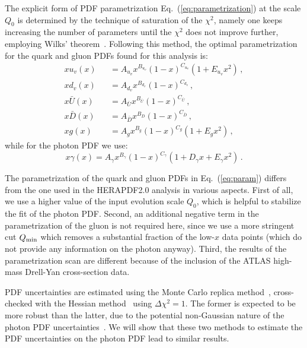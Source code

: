 The explicit form of PDF parametrization Eq.~(\ref{eq:parametrization})
at the scale $Q_0$ is determined by the
technique of saturation of the $\chi^{2}$, namely one keeps increasing
the number of parameters until the $\chi^{2}$ does not improve
further, employing Wilks' theorem~\cite{Wilks:1938dza}.
%
Following this method, the optimal parametrization for the quark and
gluon PDFs found for this analysis is:
\begin{eqnarray}
  \nonumber
  xu_v(x) &&= A_{u_v}x^{B_{u_v}}(1-x)^{C_{u_v}}(1+E_{u_v}x^{2})\, , \\
  \nonumber
xd_v(x) &&= A_{d_v}x^{B_{d_v}}(1-x)^{C_{d_v}}\, , \\
x\bar{U}(x) &&= A_{\bar{U}}x^{B_{\bar{U}}}(1-x)^{C_{\bar{U}}}\, , \\
\nonumber
x\bar{D}(x) &&= A_{\bar{D}}x^{B_{\bar{D}}}(1-x)^{C_{\bar{D}}}\, , \\
\nonumber
\label{eq:param}
xg(x) &&= A_{g}x^{B_{g}}(1-x)^{C_{g}}(1+E_{g}x^{2})\, ,
\end{eqnarray}
while for the photon PDF we use:
\begin{equation}
x\gamma(x) = A_{\gamma}x^{B_{\gamma}}(1-x)^{C_{\gamma}}(1+D_{\gamma}x+E_{\gamma}x^{2}) \, .
\end{equation}


The parametrization of the quark and gluon PDFs in
Eq.~(\ref{eq:param}) differs from the one used in the HERAPDF2.0
analysis in various aspects.
%
First of all, we use a higher value of the input evolution scale
$Q_0$, which is helpful to stabilize the fit of the photon PDF.
%
Second, an additional negative term in the parametrization of the
gluon is not required here, since we use a more stringent cut
$Q_{\rm min}$ which removes a substantial fraction of the low-$x$ data points (which do
not provide any information on the photon anyway).
%
Third, the results of the parametrization scan are different because of the
inclusion of the ATLAS high-mass Drell-Yan cross-section data.

PDF uncertainties are estimated using the Monte Carlo replica
method~\cite{DelDebbio:2004xtd,DelDebbio:2007ee,Ball:2008by},
cross-checked with
the Hessian method~\cite{Pumplin:2001ct} using $\Delta\chi^2=1$.
%
The former is expected to be more robust than the latter, due to the
potential non-Gaussian nature of the photon PDF
uncertainties~\cite{Ball:2013hta}.
%
We will show that these two methods to estimate the PDF uncertainties
on the photon PDF lead to similar results.

